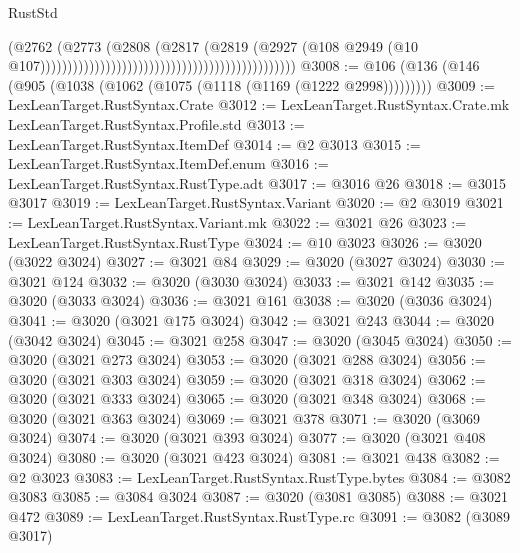 \begin{lexlean}{RustStd}
\begin{coremodule}
                                                                                  (@2762
                                                                                    (@2773
                                                                                      (@2808
                                                                                        (@2817
                                                                                          (@2819
                                                                                            (@2927
                                                                                              (@108
                                                                                                @2949
                                                                                                (@10
                                                                                                  @107)))))))))))))))))))))))))))))))))))))))))))))))
@3008 := @106 (@136 (@146 (@905 (@1038 (@1062 (@1075 (@1118 (@1169 (@1222 @2998)))))))))
@3009 := LexLeanTarget.RustSyntax.Crate
@3012 := LexLeanTarget.RustSyntax.Crate.mk LexLeanTarget.RustSyntax.Profile.std
@3013 := LexLeanTarget.RustSyntax.ItemDef
@3014 := @2 @3013
@3015 := LexLeanTarget.RustSyntax.ItemDef.enum
@3016 := LexLeanTarget.RustSyntax.RustType.adt
@3017 := @3016 @26
@3018 := @3015 @3017
@3019 := LexLeanTarget.RustSyntax.Variant
@3020 := @2 @3019
@3021 := LexLeanTarget.RustSyntax.Variant.mk
@3022 := @3021 @26
@3023 := LexLeanTarget.RustSyntax.RustType
@3024 := @10 @3023
@3026 := @3020 (@3022 @3024)
@3027 := @3021 @84
@3029 := @3020 (@3027 @3024)
@3030 := @3021 @124
@3032 := @3020 (@3030 @3024)
@3033 := @3021 @142
@3035 := @3020 (@3033 @3024)
@3036 := @3021 @161
@3038 := @3020 (@3036 @3024)
@3041 := @3020 (@3021 @175 @3024)
@3042 := @3021 @243
@3044 := @3020 (@3042 @3024)
@3045 := @3021 @258
@3047 := @3020 (@3045 @3024)
@3050 := @3020 (@3021 @273 @3024)
@3053 := @3020 (@3021 @288 @3024)
@3056 := @3020 (@3021 @303 @3024)
@3059 := @3020 (@3021 @318 @3024)
@3062 := @3020 (@3021 @333 @3024)
@3065 := @3020 (@3021 @348 @3024)
@3068 := @3020 (@3021 @363 @3024)
@3069 := @3021 @378
@3071 := @3020 (@3069 @3024)
@3074 := @3020 (@3021 @393 @3024)
@3077 := @3020 (@3021 @408 @3024)
@3080 := @3020 (@3021 @423 @3024)
@3081 := @3021 @438
@3082 := @2 @3023
@3083 := LexLeanTarget.RustSyntax.RustType.bytes
@3084 := @3082 @3083
@3085 := @3084 @3024
@3087 := @3020 (@3081 @3085)
@3088 := @3021 @472
@3089 := LexLeanTarget.RustSyntax.RustType.rc
@3091 := @3082 (@3089 @3017)

\end{coremodule}
\end{lexlean}

